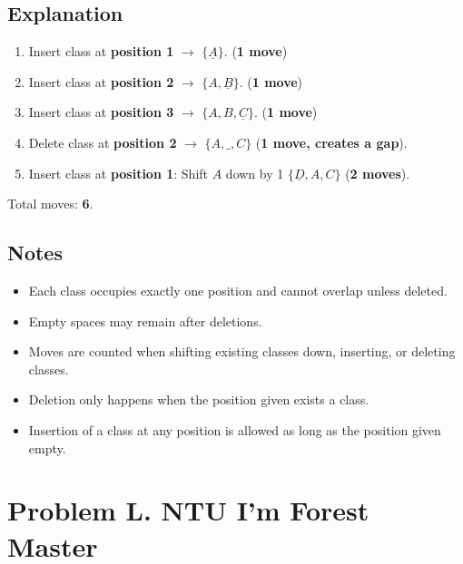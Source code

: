 \documentclass[12pt,a4paper]{article}
\begin{document}
\subsection*{\fontsize{16}{12}Explanation}
\begin{enumerate}
    \item Insert class at \textbf{position 1} $\rightarrow$ \(\{\underline{A}\}\). (\textbf{1 move})
    \item Insert class at \textbf{position 2} $\rightarrow$ \(\{A, \underline{B}\}\). (\textbf{1 move})
    \item Insert class at \textbf{position 3} $\rightarrow$ \(\{A, B, \underline{C}\}\). (\textbf{1 move})
    \item Delete class at \textbf{position 2} $\rightarrow$ \(\{A, \_, C\}\) (\textbf{1 move, creates a gap}).
    \item Insert class at \textbf{position 1}: Shift \( A \) down by 1 \(\{\underline{D}, A, C\}\) (\textbf{2 moves}).
\end{enumerate}
Total moves: \textbf{6}.

\subsection*{\fontsize{16}{12}Notes}
\begin{itemize}
    \item Each class occupies exactly one position and cannot overlap unless deleted.
    \item Empty spaces may remain after deletions.
    \item Moves are counted when shifting existing classes down, inserting, or deleting classes.
    \item Deletion only happens when the position given exists a class.
    \item Insertion of a class at any position is allowed as long as the position given empty.
\end{itemize}

\newpage
\section*{\fontsize{18}{12}Problem L. NTU I'm Forest Master}
\end{document}

